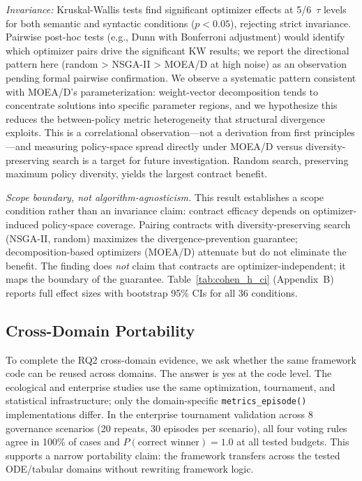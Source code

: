 \documentclass{wscpaperproc}
\begin{document}
\emph{Invariance:} Kruskal-Wallis tests find significant optimizer effects at
5/6~$\tau$ levels for both semantic and syntactic conditions ($p\!<\!0.05$),
rejecting strict invariance. Pairwise post-hoc tests (e.g., Dunn with Bonferroni
adjustment) would identify which optimizer pairs drive the significant KW results;
we report the directional pattern here (random > NSGA-II > MOEA/D at high noise)
as an observation pending formal pairwise confirmation. We observe a systematic
pattern consistent with MOEA/D's parameterization: weight-vector decomposition
tends to concentrate solutions into specific parameter regions, and we hypothesize
this reduces the between-policy metric heterogeneity that structural divergence
exploits. This is a correlational observation---not a derivation from first
principles---and measuring policy-space spread directly under MOEA/D versus
diversity-preserving search is a target for future investigation. Random search,
preserving maximum policy diversity, yields the largest contract benefit.

\emph{Scope boundary, not algorithm-agnosticism.} This result establishes a
scope condition rather than an invariance claim: contract efficacy depends on
optimizer-induced policy-space coverage. Pairing contracts with diversity-preserving
search (NSGA-II, random) maximizes the divergence-prevention guarantee;
decomposition-based optimizers (MOEA/D) attenuate but do not eliminate the benefit.
The finding does \emph{not} claim that contracts are optimizer-independent; it
maps the boundary of the guarantee. Table~\ref{tab:cohen_h_ci} (Appendix~B)
reports full effect sizes with bootstrap 95\% CIs for all 36 conditions.



\subsection{Cross-Domain Portability}
\label{sec:crossdomain}

To complete the RQ2 cross-domain evidence, we ask whether the same framework
code can be reused across domains. The answer is yes at the code level. The ecological and
enterprise studies use the same optimization, tournament, and statistical
infrastructure; only the domain-specific \texttt{metrics\_episode()}
implementations differ. In the enterprise tournament validation across 8
governance scenarios (20 repeats, 30 episodes per scenario), all four voting
rules agree in 100\% of cases and $P(\text{correct winner})\!=\!1.0$ at all
tested budgets. This supports a narrow portability claim: the framework
transfers across the tested ODE/tabular domains without rewriting framework
logic.
\end{document}
